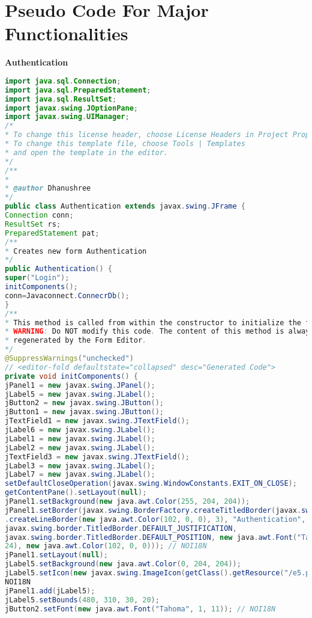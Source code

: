 \section{Pseudo Code For Major Functionalities}
\rightarrow 
\begin{large}
\textbf{Authentication}\\[0.2in]
\end{large}
\thispagestyle{fancy}
\begin{lstlisting}[language=Java]
import java.sql.Connection;
import java.sql.PreparedStatement;
import java.sql.ResultSet;
import javax.swing.JOptionPane;
import javax.swing.UIManager;
/*
* To change this license header, choose License Headers in Project Properties.
* To change this template file, choose Tools | Templates
* and open the template in the editor.
*/
/**
*
* @author Dhanushree
*/
public class Authentication extends javax.swing.JFrame {
Connection conn;
ResultSet rs;
PreparedStatement pat;
/**
* Creates new form Authentication
*/
public Authentication() {
super("Login");
initComponents();
conn=Javaconnect.ConnecrDb();
}
/**
* This method is called from within the constructor to initialize the form.
* WARNING: Do NOT modify this code. The content of this method is always
* regenerated by the Form Editor.
*/
@SuppressWarnings("unchecked")
// <editor-fold defaultstate="collapsed" desc="Generated Code">
private void initComponents() {
jPanel1 = new javax.swing.JPanel();
jLabel5 = new javax.swing.JLabel();
jButton2 = new javax.swing.JButton();
jButton1 = new javax.swing.JButton();
jTextField1 = new javax.swing.JTextField();
jLabel6 = new javax.swing.JLabel();
jLabel1 = new javax.swing.JLabel();
jLabel2 = new javax.swing.JLabel();
jTextField3 = new javax.swing.JTextField();
jLabel3 = new javax.swing.JLabel();
jLabel7 = new javax.swing.JLabel();
setDefaultCloseOperation(javax.swing.WindowConstants.EXIT_ON_CLOSE);
getContentPane().setLayout(null);
jPanel1.setBackground(new java.awt.Color(255, 204, 204));
jPanel1.setBorder(javax.swing.BorderFactory.createTitledBorder(javax.swing.BorderFactory
.createLineBorder(new java.awt.Color(102, 0, 0), 3), "Authentication",
javax.swing.border.TitledBorder.DEFAULT_JUSTIFICATION,
javax.swing.border.TitledBorder.DEFAULT_POSITION, new java.awt.Font("Tahoma", 1,
24), new java.awt.Color(102, 0, 0))); // NOI18N
jPanel1.setLayout(null);
jLabel5.setBackground(new java.awt.Color(0, 204, 204));
jLabel5.setIcon(new javax.swing.ImageIcon(getClass().getResource("/e5.png"))); //
NOI18N
jPanel1.add(jLabel5);
jLabel5.setBounds(480, 310, 30, 20);
jButton2.setFont(new java.awt.Font("Tahoma", 1, 11)); // NOI18N

\end{lstlisting}
